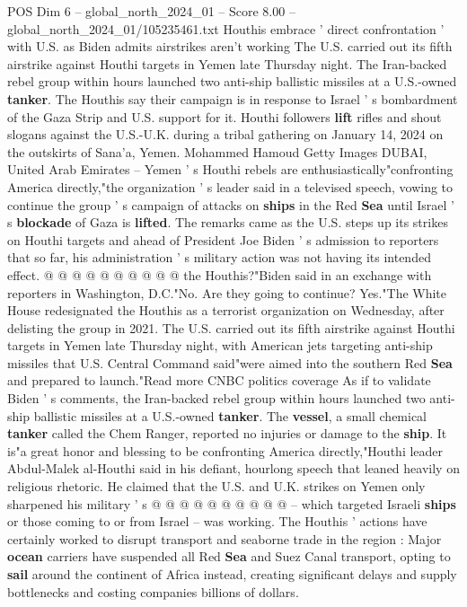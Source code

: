 \begin{textsample}{POS Dim 6 – global\_north\_2024\_01 – Score 8.00 – global\_north\_2024\_01/105235461.txt}  \label{ex:f6_pos_100}
Houthis embrace ' direct confrontation ' with U.S. as Biden admits airstrikes aren't working The U.S. carried out its fifth airstrike against Houthi targets in Yemen late Thursday night.
The Iran-backed rebel group within hours launched two anti-ship ballistic missiles at a U.S.-owned \textbf{tanker}.
The Houthis say their campaign is in response to Israel ' s bombardment of the Gaza Strip and U.S. support for it.
Houthi followers \textbf{lift} rifles and shout slogans against the U.S.-U.K. during a tribal gathering on January 14, 2024 on the outskirts of Sana'a, Yemen.
Mohammed Hamoud Getty Images DUBAI, United Arab Emirates -- Yemen ' s Houthi rebels are enthusiastically"confronting America directly,"the organization ' s leader said in a televised speech, vowing to continue the group ' s campaign of attacks on \textbf{ships} in the Red \textbf{Sea} until Israel ' s \textbf{blockade} of Gaza is \textbf{lifted}.
The remarks came as the U.S. steps up its strikes on Houthi targets and ahead of President Joe Biden ' s admission to reporters that so far, his administration ' s military action was not having its intended effect. @ @ @ @ @ @ @ @ @ @ the Houthis?"Biden said in an exchange with reporters in Washington, D.C."No.
Are they going to continue?
Yes."The White House redesignated the Houthis as a terrorist organization on Wednesday, after delisting the group in 2021.
The U.S. carried out its fifth airstrike against Houthi targets in Yemen late Thursday night, with American jets targeting anti-ship missiles that U.S.
Central Command said"were aimed into the southern Red \textbf{Sea} and prepared to launch."Read more CNBC politics coverage As if to validate Biden ' s comments, the Iran-backed rebel group within hours launched two anti-ship ballistic missiles at a U.S.-owned \textbf{tanker}.
The \textbf{vessel}, a small chemical \textbf{tanker} called the Chem Ranger, reported no injuries or damage to the \textbf{ship}.
It is"a great honor and blessing to be confronting America directly,"Houthi leader Abdul-Malek al-Houthi said in his defiant, hourlong speech that leaned heavily on religious rhetoric.
He claimed that the U.S. and U.K. strikes on Yemen only sharpened his military ' s @ @ @ @ @ @ @ @ @ @ -- which targeted Israeli \textbf{ships} or those coming to or from Israel -- was working.
The Houthis ' actions have certainly worked to disrupt transport and seaborne trade in the region : Major \textbf{ocean} carriers have suspended all Red \textbf{Sea} and Suez Canal transport, opting to \textbf{sail} around the continent of Africa instead, creating significant delays and supply bottlenecks and costing companies billions of dollars.

\end{textsample}
